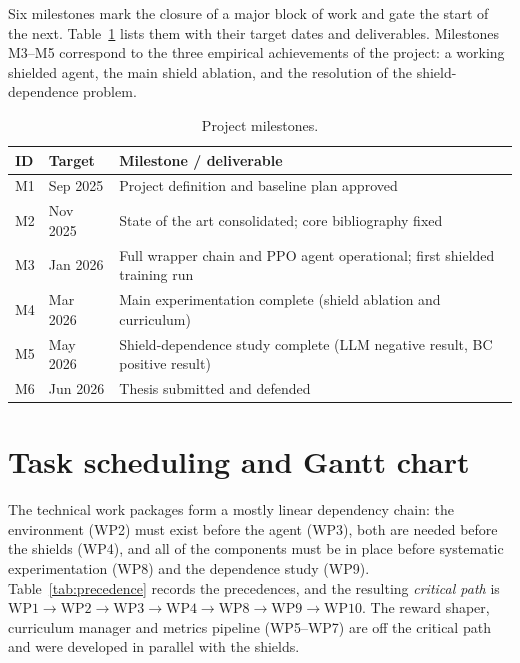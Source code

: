 Six milestones mark the closure of a major block of work and gate the start of the next.
Table~\ref{tab:milestones} lists them with their target dates and deliverables. Milestones M3--M5
correspond to the three empirical achievements of the project: a working shielded agent, the main
shield ablation, and the resolution of the shield-dependence problem.

\begin{table}[H]
  \centering
  \caption{Project milestones.}
  \label{tab:milestones}
  \small
  \begin{tabular}{@{}llp{7.4cm}@{}}
    \toprule
    \textbf{ID} & \textbf{Target} & \textbf{Milestone / deliverable} \\
    \midrule
    M1 & Sep 2025 & Project definition and baseline plan approved \\
    M2 & Nov 2025 & State of the art consolidated; core bibliography fixed \\
    M3 & Jan 2026 & Full wrapper chain and PPO agent operational; first shielded training run \\
    M4 & Mar 2026 & Main experimentation complete (shield ablation and curriculum) \\
    M5 & May 2026 & Shield-dependence study complete (LLM negative result, BC positive result) \\
    M6 & Jun 2026 & Thesis submitted and defended \\
    \bottomrule
  \end{tabular}
\end{table}

\section{Task scheduling and Gantt chart}\label{sec:plan-schedule}

The technical work packages form a mostly linear dependency chain: the environment (WP2) must
exist before the agent (WP3), both are needed before the shields (WP4), and all of the
components must be in place before systematic experimentation (WP8) and the dependence study
(WP9). Table~\ref{tab:precedence} records the precedences, and the resulting \emph{critical path} is
\(\text{WP1}\to\text{WP2}\to\text{WP3}\to\text{WP4}\to\text{WP8}\to\text{WP9}\to\text{WP10}\).
The reward shaper, curriculum manager and metrics pipeline (WP5--WP7) are off the critical path
and were developed in parallel with the shields.


